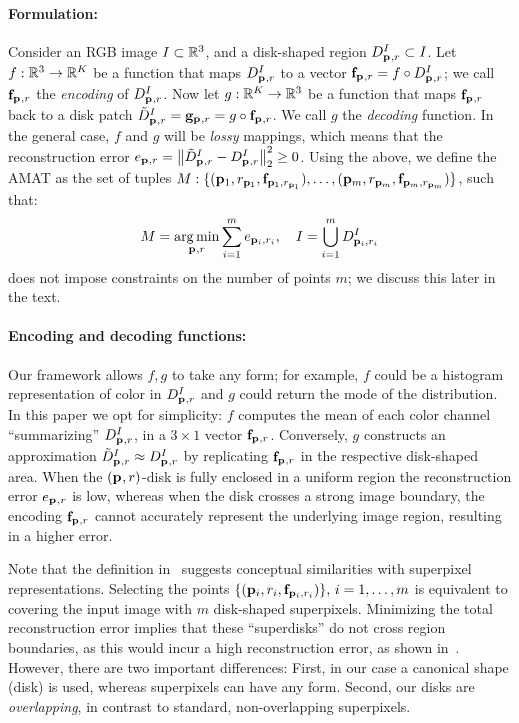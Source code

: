 \documentclass[10pt,twocolumn,letterpaper]{article}
\begin{document}
\paragraph{Formulation:} Consider an RGB image $I\subset\mathbb{R}^3$, and a disk-shaped region $D_{\mathbf{p}_{},r}^I \subset I$.
Let $f:\mathbb{R}^3 \rightarrow \mathbb{R}^K$ be a function that maps $D_{\mathbf{p}_{},r}^I$ to a vector  $\mathbf{f}_{\mathbf{p}_{},r}=f\circ D_{\mathbf{p}_{},r}^I$; 
we call $\mathbf{f}_{\mathbf{p}_{},r}$ the \emph{encoding} of $D_{\mathbf{p}_{},r}^I$. 
Now let $g:\mathbb{R}^K \rightarrow \mathbb{R}^3$ be a function that maps $\mathbf{f}_{\mathbf{p}_{},r}$ back to a disk patch 
$\tilde{D}_{\mathbf{p}_{},r}^I = \mathbf{g}_{\mathbf{p}_{},r} = g \circ \mathbf{f}_{\mathbf{p}_{},r}$. We call $g$ the \emph{decoding} function.
In the general case, $f$ and $g$ will be \emph{lossy} mappings, which means that the reconstruction error 
$e_{\mathbf{p}_{},r} = \left \lVert  \tilde{D}_{\mathbf{p}_{},r}^I - D_{\mathbf{p}_{},r}^I \right \rVert_2^2 \geq 0$. 
Using the above, we define the AMAT as the set of tuples 
$M:\{ ( \mathbf{p}_{1},r_{\mathbf{p}_{1}}, \mathbf{f}_{\mathbf{p}_{1},r_{\mathbf{p}_{1}}} ), \ldots, ( \mathbf{p}_{m},r_{\mathbf{p}_{m}}, \mathbf{f}_{\mathbf{p}_{m},r_{\mathbf{p}_{m}}} ) \}$, such that:
\begin{equation}
M = \operatorname*{arg\,min}_{\mathbf{p}_{},r}{\sum_{i=1}^m e_{\mathbf{p}_{i},r_i}},\quad I=\bigcup_{i=1}^m D_{\mathbf{p}_{i},r_i}^I 
\label{eq:minimization}
\end{equation}
 does not impose constraints on the number of points $m$;
we discuss this later in the text.
\paragraph{Encoding and decoding functions:}
Our framework allows $f,g$ to take any form; 
for example, $f$ could be a histogram representation of color in $D_{\mathbf{p}_{},r}^I$ and $g$ could return the mode of the distribution.
In this paper we opt for simplicity:
$f$ computes the mean of each color channel ``summarizing'' $D_{\mathbf{p}_{},r}^I$, in a $3\times1$ vector $\mathbf{f}_{\mathbf{p}_{},r}$.
Conversely, $g$ constructs an approximation $\tilde{D}_{\mathbf{p}_{},r}^I \approx D_{\mathbf{p}_{},r}^I$ by replicating $\mathbf{f}_{\mathbf{p}_{},r}$ in the
respective disk-shaped area.
When the $(\mathbf{p}_{},r)$-disk is fully enclosed in a uniform region the reconstruction error $e_{\mathbf{p}_{},r}$
is low, whereas when the disk crosses a strong image boundary, the encoding $\mathbf{f}_{\mathbf{p}_{},r}$ cannot accurately represent
the underlying image region, resulting in a higher error. 

Note that the definition in~ suggests conceptual similarities with superpixel representations.
Selecting the points $\{ (\mathbf{p}_{i},r_i,\mathbf{f}_{\mathbf{p}_{i},r_i}) \},\,i=1,\ldots,m$ is equivalent to covering the input image
with $m$ disk-shaped superpixels. Minimizing the total reconstruction error implies that these ``superdisks'' do not
cross region boundaries, as this would incur a high reconstruction error, as shown in~.
However, there are two important differences:
First, in our case a canonical shape (disk) is used, whereas superpixels can have any form. 
Second, our disks are \emph{overlapping}, in contrast to standard, non-overlapping superpixels.
\end{document}
